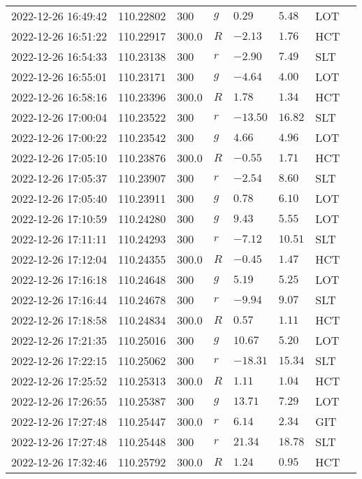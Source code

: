 \documentclass{nature_plusfigure}
\begin{document}
\begin{supplement}
\begin{center}
\begin{longtable}{llllllll}
2022-12-26 16:49:42 & 110.22802 & 300 & $g$ & $0.29$ & $5.48$ & LOT &  \\ 
2022-12-26 16:51:22 & 110.22917 & 300.0 & $R$ & $-2.13$ & $1.76$ & HCT &  \\ 
2022-12-26 16:54:33 & 110.23138 & 300 & $r$ & $-2.90$ & $7.49$ & SLT &  \\ 
2022-12-26 16:55:01 & 110.23171 & 300 & $g$ & $-4.64$ & $4.00$ & LOT &  \\ 
2022-12-26 16:58:16 & 110.23396 & 300.0 & $R$ & $1.78$ & $1.34$ & HCT &  \\ 
2022-12-26 17:00:04 & 110.23522 & 300 & $r$ & $-13.50$ & $16.82$ & SLT &  \\ 
2022-12-26 17:00:22 & 110.23542 & 300 & $g$ & $4.66$ & $4.96$ & LOT &  \\ 
2022-12-26 17:05:10 & 110.23876 & 300.0 & $R$ & $-0.55$ & $1.71$ & HCT &  \\ 
2022-12-26 17:05:37 & 110.23907 & 300 & $r$ & $-2.54$ & $8.60$ & SLT &  \\ 
2022-12-26 17:05:40 & 110.23911 & 300 & $g$ & $0.78$ & $6.10$ & LOT &  \\ 
2022-12-26 17:10:59 & 110.24280 & 300 & $g$ & $9.43$ & $5.55$ & LOT &  \\ 
2022-12-26 17:11:11 & 110.24293 & 300 & $r$ & $-7.12$ & $10.51$ & SLT &  \\ 
2022-12-26 17:12:04 & 110.24355 & 300.0 & $R$ & $-0.45$ & $1.47$ & HCT &  \\ 
2022-12-26 17:16:18 & 110.24648 & 300 & $g$ & $5.19$ & $5.25$ & LOT &  \\ 
2022-12-26 17:16:44 & 110.24678 & 300 & $r$ & $-9.94$ & $9.07$ & SLT &  \\ 
2022-12-26 17:18:58 & 110.24834 & 300.0 & $R$ & $0.57$ & $1.11$ & HCT &  \\ 
2022-12-26 17:21:35 & 110.25016 & 300 & $g$ & $10.67$ & $5.20$ & LOT &  \\ 
2022-12-26 17:22:15 & 110.25062 & 300 & $r$ & $-18.31$ & $15.34$ & SLT &  \\ 
2022-12-26 17:25:52 & 110.25313 & 300.0 & $R$ & $1.11$ & $1.04$ & HCT &  \\ 
2022-12-26 17:26:55 & 110.25387 & 300 & $g$ & $13.71$ & $7.29$ & LOT &  \\ 
2022-12-26 17:27:48 & 110.25447 & 300.0 & $r$ & $6.14$ & $2.34$ & GIT &  \\ 
2022-12-26 17:27:48 & 110.25448 & 300 & $r$ & $21.34$ & $18.78$ & SLT &  \\ 
2022-12-26 17:32:46 & 110.25792 & 300.0 & $R$ & $1.24$ & $0.95$ & HCT &  \\ 

\end{longtable}
\end{center}
\end{supplement}
\end{document}
